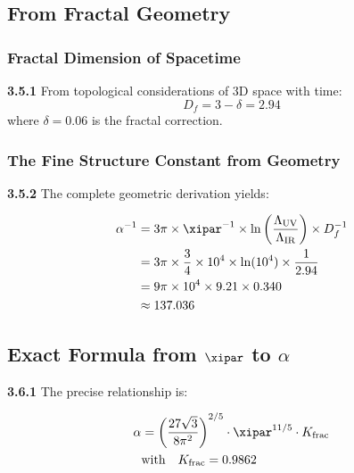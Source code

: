 	\subsection{From Fractal Geometry}
	
	\subsubsection{Fractal Dimension of Spacetime}
	
	\noindent \textbf{3.5.1} From topological considerations of 3D space with time:
	\begin{equation}
		D_f = 3 - \delta = 2.94
	\end{equation}
	where $\delta = 0.06$ is the fractal correction.
	
	\subsubsection{The Fine Structure Constant from Geometry}
	
	\noindent \textbf{3.5.2} The complete geometric derivation yields:
	\begin{keyresult}
		\begin{align}
			\alpha^{-1} &= 3\pi \times \xipar^{-1} \times \ln\left(\frac{\Lambda_{\text{UV}}}{\Lambda_{\text{IR}}}\right) \times D_f^{-1} \\
			&= 3\pi \times \frac{3}{4} \times 10^{4} \times \ln(10^{4}) \times \frac{1}{2.94} \\
			&= 9\pi \times 10^{4} \times 9.21 \times 0.340 \\
			&\approx 137.036
		\end{align}
	\end{keyresult}
	
	\subsection{Exact Formula from $\xipar$ to $\alpha$}
	
	\noindent \textbf{3.6.1} The precise relationship is:
	\begin{keyresult}
		\begin{align}
			\alpha &= \left( \frac{27 \sqrt{3}}{8 \pi^2} \right)^{2/5} \cdot \xipar^{11/5} \cdot K_{\text{frac}} \\
			&\text{with} \quad K_{\text{frac}} = 0.9862
		\end{align}
	\end{keyresult}
	
